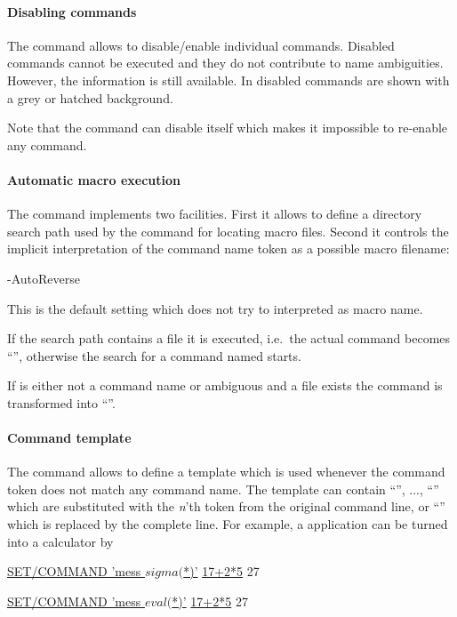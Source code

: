 \paragraph{Disabling commands}

The command  allows to disable/enable individual commands.
Disabled commands cannot be executed and they do not contribute to
name ambiguities.
However, the  information is still available.
In  disabled commands are shown with a grey or hatched
background. 

Note that the  command can disable itself which makes
it impossible to re-enable any command.


\paragraph{Automatic macro execution}

The command  implements two facilities.
First it allows to define a directory search path used by the
 command for locating  macro files.
Second it controls the implicit interpretation of the command name token as a
possible macro filename:
\begin{DLtt}{-AutoReverse}
\item[\Lit{-Command}]
This is the default setting which does not try to interpreted
 as macro name.
\item[\Lit{-Auto}]
If the search path contains a file  it is executed,
i.e.\ the actual command becomes ``'', otherwise the
search for a command named  starts.
\item[\Lit{-AutoReverse}]
If  is either not a command name or ambiguous and a file
 exists the command is transformed into 
``''.
\end{DLtt}


\paragraph{Command template}

The command  allows to define a template which is
used whenever the command token does not match any command name.
The template can contain ``'', ..., ``'' which are
substituted with the \textsl{n}'th token from the original command line,
or ``\Lit{$*}'' which is replaced by the complete line.
For example, a \KUIP{} application can be turned into a calculator by
\ifPAWman
\begin{XMP}
\PROMPT{} \underline{SET/COMMAND 'mess $sigma($*)'}
\PROMPT{} \underline{17+2*5}
 27
\end{XMP}
\else
\begin{XMP}
\PROMPT{} \underline{SET/COMMAND 'mess $eval($*)'}
\PROMPT{} \underline{17+2*5}
 27
\end{XMP}
\fi

